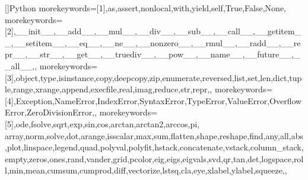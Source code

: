 \documentclass[a4paper,12pt]{article}
\begin{document}



[]{Python}{
	morekeywords=[1]{,as,assert,nonlocal,with,yield,self,True,False,None,} %
	morekeywords=[2]{,__init__,__add__,__mul__,__div__,__sub__,__call__,__getitem__,__setitem__,__eq__,__ne__,__nonzero__,__rmul__,__radd__,__repr__,__str__,__get__,__truediv__,__pow__,__name__,__future__,__all__,}, %
	morekeywords=[3]{,object,type,isinstance,copy,deepcopy,zip,enumerate,reversed,list,set,len,dict,tuple,range,xrange,append,execfile,real,imag,reduce,str,repr,}, %
	morekeywords=[4]{,Exception,NameError,IndexError,SyntaxError,TypeError,ValueError,OverflowError,ZeroDivisionError,}, %
	morekeywords=[5]{,ode,fsolve,sqrt,exp,sin,cos,arctan,arctan2,arccos,pi, array,norm,solve,dot,arange,isscalar,max,sum,flatten,shape,reshape,find,any,all,abs,plot,linspace,legend,quad,polyval,polyfit,hstack,concatenate,vstack,column_stack,empty,zeros,ones,rand,vander,grid,pcolor,eig,eigs,eigvals,svd,qr,tan,det,logspace,roll,min,mean,cumsum,cumprod,diff,vectorize,lstsq,cla,eye,xlabel,ylabel,squeeze,}, %
}

\end{document}
